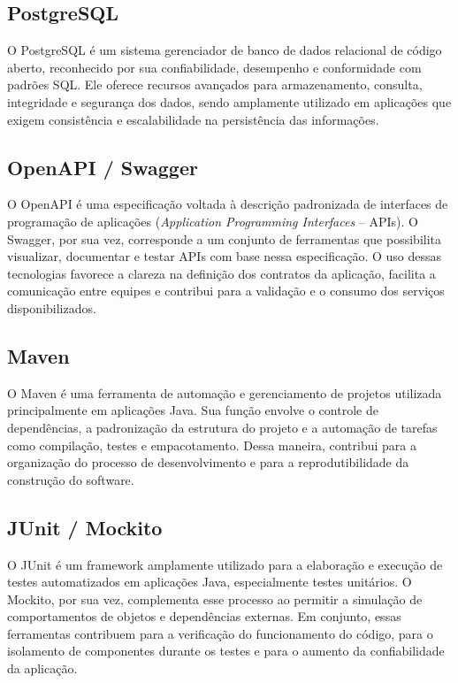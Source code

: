 \documentclass[grad,pdftex]{poli}
\begin{document}
\subsection{PostgreSQL}

O PostgreSQL é um sistema gerenciador de banco de dados relacional de código aberto, reconhecido por sua confiabilidade, desempenho e conformidade com padrões SQL. Ele oferece recursos avançados para armazenamento, consulta, integridade e segurança dos dados, sendo amplamente utilizado em aplicações que exigem consistência e escalabilidade na persistência das informações.

\subsection{OpenAPI / Swagger}

O OpenAPI é uma especificação voltada à descrição padronizada de interfaces de programação de aplicações (\textit{Application Programming Interfaces} -- APIs). O Swagger, por sua vez, corresponde a um conjunto de ferramentas que possibilita visualizar, documentar e testar APIs com base nessa especificação. O uso dessas tecnologias favorece a clareza na definição dos contratos da aplicação, facilita a comunicação entre equipes e contribui para a validação e o consumo dos serviços disponibilizados.

\subsection{Maven}

O Maven é uma ferramenta de automação e gerenciamento de projetos utilizada principalmente em aplicações Java. Sua função envolve o controle de dependências, a padronização da estrutura do projeto e a automação de tarefas como compilação, testes e empacotamento. Dessa maneira, contribui para a organização do processo de desenvolvimento e para a reprodutibilidade da construção do software.

\subsection{JUnit / Mockito}

O JUnit é um framework amplamente utilizado para a elaboração e execução de testes automatizados em aplicações Java, especialmente testes unitários. O Mockito, por sua vez, complementa esse processo ao permitir a simulação de comportamentos de objetos e dependências externas. Em conjunto, essas ferramentas contribuem para a verificação do funcionamento do código, para o isolamento de componentes durante os testes e para o aumento da confiabilidade da aplicação.
\end{document}
